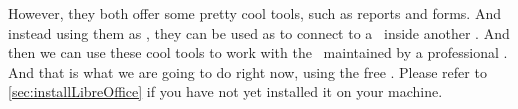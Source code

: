 However, they both offer some pretty cool tools, such as reports and forms.
And instead using them as \dbms, they can be used as  to connect to a \db\ inside another \dbms.
And then we can use these cool tools to work with the \db\ maintained by a professional \dbms.
And that is what we are going to do right now, using the free \libreofficeBase.
Please refer to \cref{sec:installLibreOffice} if you have not yet installed it on your machine.%
%
\FloatBarrier%
%
%
%
%
%
%
%
%
\FloatBarrier%
\endhsection%
%
